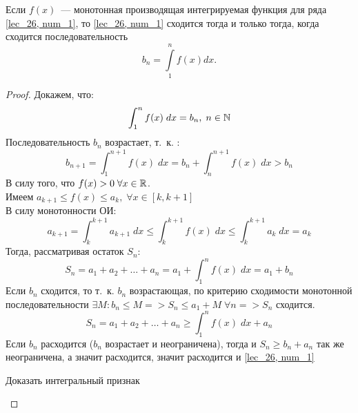 \documentclass[../../main.tex]{subfiles}
\begin{document}
	\begin{thm} \label{lec27,integral_att}
		Если $f(x)$~--- монотонная производящая интегрируемая функция для ряда 
		\eqref{lec_26, num_1}, то \eqref{lec_26, num_1} сходится тогда и только 
		тогда, когда сходится последовательность \[b_n = \int\limits_1^n f(x)dx.\]
		\begin{proof}
			Докажем, что:
			\[ \int_{1}^{n} f(x) \; dx = b_n , \; n \in \mathbb{N}  \]
			Последовательность $b_n$ возрастает, т.~к. :
			\[ b_{n+1} = \int_{1}^{n+1} f(x) \; dx  = b_n + \int_{n}^{n+1} f(x) \; dx > 
			b_n \]
			В силу того, что $f(x) > 0 \; \forall x \in \mathbb{R}$.\\			
			Имеем $a_{k+1} \le f(x) \le a_k, \; \forall x \in [k,k+1]$\\		
			В силу монотонности ОИ:
			\[ a_{k+1} = \int_{k}^{k+1}a_{k+1} \; dx  \le \int_{k}^{k+1}f(x) \; dx \le 
			\int_{k}^{k+1}a_{k} \; dx  = a_{k}   \]
			Тогда, рассматривая остаток $S_n$:
			\[ S_n = a_1 + a_2 + \dots + a_n = a_1 +  \int_{1}^{n}f(x) \; dx  = a_1 + 
			b_n \]
			Если $b_n$ сходится, то т.~к. $b_n$ возрастающая, по критерию сходимости 
			монотонной последовательности $\exists M : b_n \le M => S_n \le a_1 + M \;  
			\forall n => S_n$ сходится.
			\[ S_n = a_1 + a_2 + \dots + a_n \ge \int_{1}^{n}f(x) \; dx  + a_n   \]
			Если $b_n$ расходится ($b_n$  возрастает и неограничена), тогда и $S_n \ge 
			b_n + a_n$ так же неограничена, а значит расходится, значит расходится и 
			\ref{lec_26, num_1}
			\begin{exc}
				Доказать интегральный признак
			\end{exc}	
		\end{proof}
	\end{thm}
\end{document}

